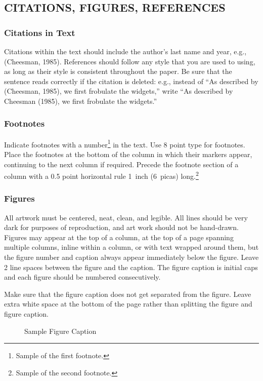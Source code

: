 \documentclass[twoside]{article}
\begin{document}
\subsection{CITATIONS, FIGURES, REFERENCES}


\subsubsection{Citations in Text}

Citations within the text should include the author's last name and
year, e.g., (Cheesman, 1985). References should follow any style that
you are used to using, as long as their style is consistent throughout
the paper.  Be sure that the sentence reads correctly if the citation
is deleted: e.g., instead of ``As described by (Cheesman, 1985), we
first frobulate the widgets,'' write ``As described by Cheesman
(1985), we first frobulate the widgets.''  %

\subsubsection{Footnotes}

Indicate footnotes with a number\footnote{Sample of the first
  footnote.} in the text. Use 8 point type for footnotes. Place the
footnotes at the bottom of the column in which their markers appear,
continuing to the next column if required. Precede the footnote
section of a column with a 0.5 point horizontal rule 1~inch (6~picas)
long.\footnote{Sample of the second footnote.}

\subsubsection{Figures}

All artwork must be centered, neat, clean, and legible.  All lines
should be very dark for purposes of reproduction, and art work should
not be hand-drawn.  Figures may appear at the top of a column, at the
top of a page spanning multiple columns, inline within a column, or
with text wrapped around them, but the figure number and caption
always appear immediately below the figure.  Leave 2 line spaces
between the figure and the caption. The figure caption is initial caps
and each figure should be numbered consecutively.

Make sure that the figure caption does not get separated from the
figure. Leave extra white space at the bottom of the page rather than
splitting the figure and figure caption.
\begin{figure}[h]
\vspace{.3in}
\centerline{}
\vspace{.3in}
\caption{Sample Figure Caption}
\end{figure}
\end{document}
